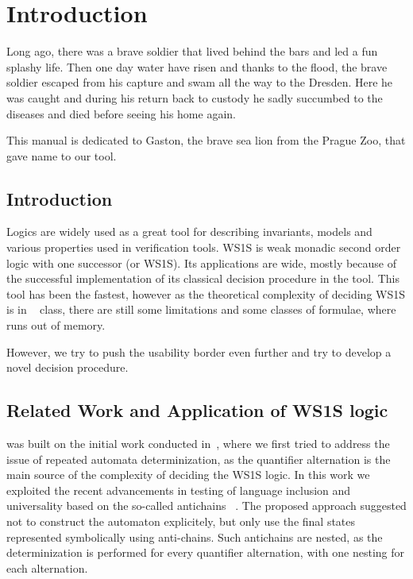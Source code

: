  
\chapter{Introduction}
\begin{intro}
Long ago, there was a brave soldier that lived behind the bars and
led a fun splashy life. Then one day water have risen and thanks to
the flood, the brave soldier escaped from his capture and swam all
the way to the Dresden. Here he was caught and during his return
back to custody he sadly succumbed to the diseases and died before
seeing his home again.

This manual is dedicated to Gaston, the brave sea lion from the Prague 
Zoo, that gave name to our tool.
\end{intro}

\section{Introduction}

Logics are widely used as a great tool for describing invariants,
models and various properties used in verification tools.
WS1S is weak monadic second order logic with one successor (or WS1S).
Its applications are wide, mostly because of the successful 
implementation of its classical decision procedure in the \mona tool.
This tool has been the fastest, however as the theoretical 
complexity of deciding WS1S is in \nonelementary~\cite{ws1s:nonelementary} class,
there are still some limitations and some classes of formulae,
where \mona runs out of memory. 

However, we try to push the usability border even further and try to
develop a novel decision procedure. 

\section{Related Work and Application of WS1S logic}

\gaston was built on the initial work conducted in~\cite{dwina}, where we first 
tried to address the issue of repeated automata determinization, as the 
quantifier alternation is the main source of the \nonelementary complexity
of deciding the WS1S logic. In this work we exploited the recent advancements
in testing of language inclusion and universality based on the so-called antichains
~\cite{antichains, wulf:antichains}. The proposed approach suggested not to construct the automaton
explicitely, but only use the final states represented symbolically using anti-chains. 
Such antichains are nested, as the determinization is performed for every quantifier
alternation, with one nesting for each alternation. 

